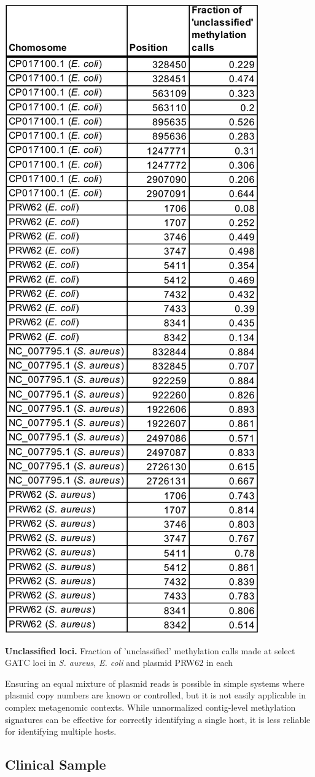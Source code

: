 \begin{table}[!hb]
\centering
\includegraphics[width = .5\linewidth,keepaspectratio]{figure/modprobs.pdf}
\caption[Unclassified loci]{{\bf Unclassified loci.} Fraction of 'unclassified' methylation calls made at select GATC loci in \textit{S. aureus}, \textit{E. coli} and plasmid PRW62 in each }
\label{tab:modprobs}
\end{table}


Ensuring an equal mixture of plasmid reads is possible in simple systems where plasmid copy numbers are known or controlled, but it is not easily applicable in complex metagenomic contexts. While unnormalized contig-level methylation signatures can be effective for correctly identifying a single host, it is less reliable for identifying multiple hosts.


\subsection{Clinical Sample}
\label{sec:mdr}

